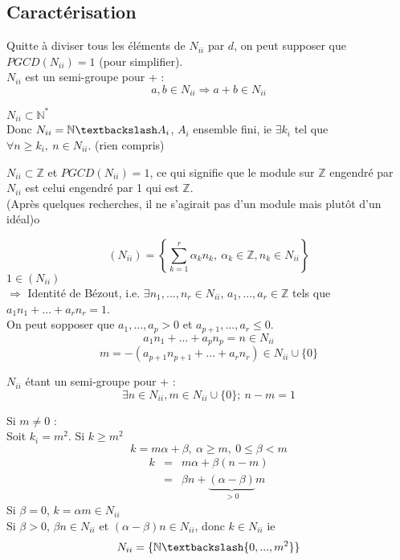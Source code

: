\subsection{Caractérisation}

\begin{dem}
Quitte à diviser tous les éléments de $N_{ii}$ par $d$, on peut supposer que $PGCD(N_{ii})=1$ (pour simplifier).\\
$N_{ii}$ est un semi-groupe pour + :
	\[a,b\in N_{ii}\Rightarrow a+b\in N_{ii}\]

\bigskip
$N_{ii}\subset \mathbb{N}^*$\\
Donc $N_{ii}=\mathbb{N}\textbackslash A_i$, $A_i$ ensemble fini, ie $\exists k_i$ tel que $\forall n\geq k_i,\ n\in N_{ii}$.  (rien compris)

$N_{ii}\subset \mathbb{Z}$ et $PGCD (N_{ii})=1$, ce qui signifie que le module sur $\mathbb{Z}$ engendré par $N_{ii}$ est celui engendré par 1 qui est $\mathbb{Z}$. \\
(Après quelques recherches, il ne s'agirait pas d'un module mais plutôt d'un idéal)o

\[(N_{ii})=\left\{\sum_{k=1}^r \alpha_kn_k,\ \alpha_k\in\mathbb{Z}, n_k\in N_{ii}\right\}\]
$1\in (N_{ii})$\\
$\Rightarrow$ Identité de Bézout, i.e. $\exists n_1,...,n_r\in N_{ii}$, $a_1,...,a_r\in \mathbb{Z}$ tels que $a_1n_1+...+a_rn_r=1$.\\
On peut sopposer que $a_1,...,a_p>0$ et $a_{p+1},...,a_r\leq 0$.
	\[a_1n_1+...+a_pn_p=n\in N_{ii}\]
	\[m=-(a_{p+1}n_{p+1}+...+a_rn_r)\in N_{ii}\cup \{0\}\]

	$N_{ii}$ étant un semi-groupe pour + :
	\[\exists n\in N_{ii}, m\in N_{ii}\cup\{0\};\ n-m=1\]

	Si $m\neq 0$ :\\
Soit $k_i=m^2$. Si $k\geq m^2$
	\[k=m\alpha+\beta,\ \alpha\geq m,\ 0\leq \beta<m\]
\begin{eqnarray*}
	k&=&m\alpha+\beta(n-m)\\
	&=&\beta n+\underbrace{(\alpha-\beta)}_{>0}m
\end{eqnarray*}
Si $\beta=0$, $k=\alpha m\in N_{ii}$\\
Si $\beta>0$, $\beta n\in N_{ii}$ et $(\alpha-\beta)n\in N_{ii}$, donc $k\in N_{ii}$ ie 
	\[N_{ii}=\{\mathbb{N}\textbackslash \{0,...,m^2\}\}\]
\end{dem}


